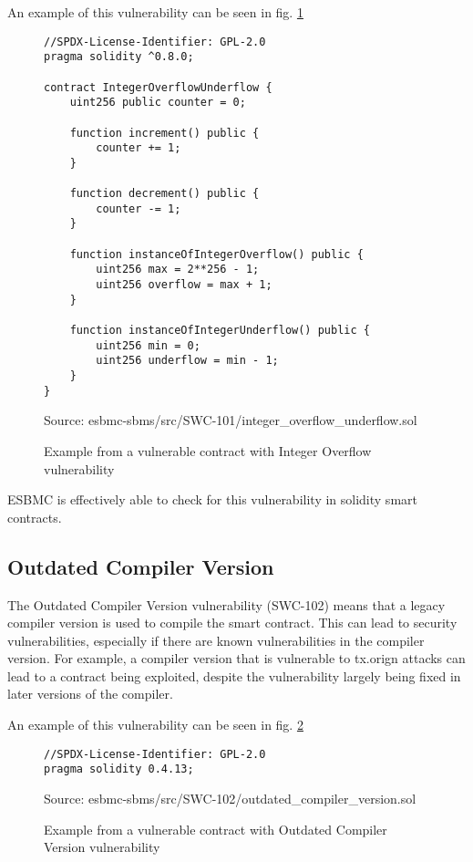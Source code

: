 An example of this vulnerability can be seen in fig. \ref{fig:integer_overflow_underflow}

\begin{figure}
\begin{lstlisting}
//SPDX-License-Identifier: GPL-2.0
pragma solidity ^0.8.0;

contract IntegerOverflowUnderflow {
    uint256 public counter = 0;

    function increment() public {
        counter += 1;
    }

    function decrement() public {
        counter -= 1;
    }

    function instanceOfIntegerOverflow() public {
        uint256 max = 2**256 - 1;
        uint256 overflow = max + 1;
    }

    function instanceOfIntegerUnderflow() public {
        uint256 min = 0;
        uint256 underflow = min - 1;
    }
}
\end{lstlisting}
\caption{Example from a vulnerable contract with Integer Overflow vulnerability }
Source: esbmc-sbms/src/SWC-101/integer\_overflow\_underflow.sol
\label{fig:integer_overflow_underflow}
\end{figure}



ESBMC is effectively able to check for this vulnerability in solidity smart contracts.

\subsection{Outdated Compiler Version}
\label{sec:outdated_compiler}

The Outdated Compiler Version vulnerability (SWC-102) means that a legacy compiler version is used to compile the smart contract. This can lead to security vulnerabilities, especially if there are known vulnerabilities in the compiler version. For example, a compiler version that is vulnerable to tx.orign attacks can lead to a contract being exploited, despite the vulnerability largely being fixed in later versions of the compiler.

An example of this vulnerability can be seen in fig. \ref{fig:outdated_compiler_version}

\begin{figure}
\begin{lstlisting}
//SPDX-License-Identifier: GPL-2.0
pragma solidity 0.4.13;
\end{lstlisting}
\caption{Example from a vulnerable contract with Outdated Compiler Version vulnerability }
Source: esbmc-sbms/src/SWC-102/outdated\_compiler\_version.sol
\label{fig:outdated_compiler_version}
\end{figure}




